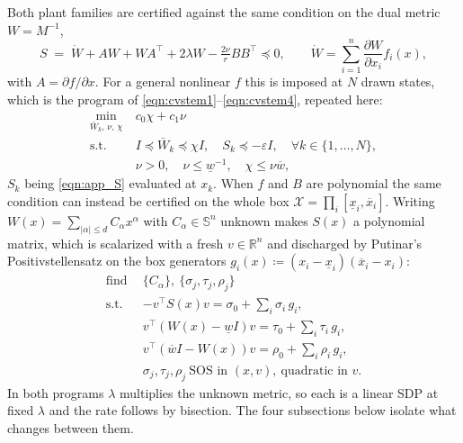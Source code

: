 \documentclass[lettersize,journal]{IEEEtran}
\begin{document}
Both plant families are certified against the same condition on the dual metric
$W=M^{-1}$,
\begin{equation}\label{eqn:app_S}
    S \;=\; \dot{W} + AW + WA^\top + 2\lambda W - \tfrac{2\nu}{r}BB^\top \preceq 0,
    \qquad \dot W = \sum_{i=1}^{n}\frac{\partial W}{\partial x_i}f_i(x),
\end{equation}
with $A=\partial f/\partial x$. For a general nonlinear $f$ this is imposed at
$N$ drawn states, which is the program of
\eqref{eqn:cvstem1}--\eqref{eqn:cvstem4}, repeated here:
\begin{align}
    \min_{\bar{W}_k,\,\nu,\,\chi} \ & c_0\chi + c_1\nu \label{eqn:app_cvstem1}\\
    \text{s.t.} \ & I \preceq \bar{W}_k \preceq \chi I, \quad
      S_k \preceq -\varepsilon I, \quad \forall k \in \{1,\dots,N\},
      \label{eqn:app_cvstem2}\\
    & \nu > 0, \quad \nu \leq \underline{w}^{-1}, \quad \chi \leq \nu \overline{w},
      \label{eqn:app_cvstem3}
\end{align}
$S_k$ being \eqref{eqn:app_S} evaluated at $x_k$. When $f$ and $B$ are
polynomial the same condition can instead be certified on the whole box
$\mathcal{X}=\prod_i[\underline x_i,\overline x_i]$. Writing
$W(x)=\sum_{|\alpha|\le d}C_\alpha x^\alpha$ with $C_\alpha\in\mathbb{S}^n$
unknown makes $S(x)$ a polynomial matrix, which is scalarized with a fresh
$v\in\mathbb{R}^n$ and discharged by Putinar's Positivstellensatz on the box
generators $g_i(x)\coloneq(x_i-\underline x_i)(\overline x_i-x_i)$:
\begin{align}
    \text{find} \ \ & \{C_\alpha\},\ \{\sigma_j,\tau_j,\rho_j\} \label{eqn:app_sos1}\\
    \text{s.t.} \ \ & -v^\top S(x)v = \sigma_0 + \textstyle\sum_i \sigma_i\, g_i,
      \label{eqn:app_sos2}\\
    & v^\top(W(x)-\underline{w}I)v = \tau_0 + \textstyle\sum_i \tau_i\, g_i,
      \label{eqn:app_sos3}\\
    & v^\top(\overline{w}I-W(x))v = \rho_0 + \textstyle\sum_i \rho_i\, g_i,
      \label{eqn:app_sos4}\\
    & \sigma_j,\tau_j,\rho_j \ \text{SOS in }(x,v),\ \text{quadratic in } v.
      \label{eqn:app_sos5}
\end{align}
In both programs $\lambda$ multiplies the unknown metric, so each is a linear
SDP at fixed $\lambda$ and the rate follows by bisection. The four subsections
below isolate what changes between them.
\end{document}
